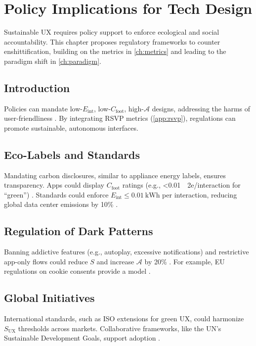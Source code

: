 \documentclass[openany]{book}
\newcommand{\Sent}{S} %
\newcommand{\Eint}{E_{\mathrm{int}}} %
\newcommand{\Cfoot}{C_{\mathrm{foot}}} %
\newcommand{\Auton}{\mathcal{A}} %
\newcommand{\SUX}{S_{\mathrm{UX}}} %
\newcommand{\kWh}{\mathrm{kWh}}
\begin{document}
\chapter{Policy Implications for Tech Design}
\label{ch:policy}

Sustainable UX requires policy support to enforce ecological and social accountability. This chapter proposes regulatory frameworks to counter enshittification, building on the metrics in \cref{ch:metrics} and leading to the paradigm shift in \cref{ch:paradigm}.

\section{Introduction}
\label{sec:policy-intro}
Policies can mandate low-$\Eint$, low-$\Cfoot$, high-$\Auton$ designs, addressing the harms of user-friendliness \citep{adobe2021,doctorow2022}. By integrating RSVP metrics (\cref{app:rsvp}), regulations can promote sustainable, autonomous interfaces.

\section{Eco-Labels and Standards}
\label{sec:policy-labels}
Mandating carbon disclosures, similar to appliance energy labels, ensures transparency. Apps could display $\Cfoot$ ratings (e.g., \SI{<0.01}{\kgCO2e}/interaction for \enquote{green}) \citep{adobe2021}. Standards could enforce $\Eint \leq \SI{0.01}{\kWh}$ per interaction, reducing global data center emissions by 10\% \citep{extentia2024}.

\section{Regulation of Dark Patterns}
\label{sec:policy-dark}
Banning addictive features (e.g., autoplay, excessive notifications) and restrictive app-only flows could reduce $\Sent$ and increase $\Auton$ by 20\% \citep{colak2024,doctorow2022}. For example, EU regulations on cookie consents provide a model \citep{colak2024}.

\section{Global Initiatives}
\label{sec:policy-global}
International standards, such as ISO extensions for green UX, could harmonize $\SUX$ thresholds across markets. Collaborative frameworks, like the UN’s Sustainable Development Goals, support adoption \citep{adobe2021}.
\end{document}
